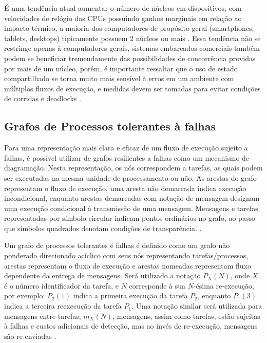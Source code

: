 É uma tendência atual aumentar o número de núcleos em dispositivos, com velocidades de relógio das CPUs possuindo ganhos marginais em relação ao impacto térmico, a maioria dos computadores de propósito geral (smartphones, tablets, desktops) tipicamente possuem 2 núcleos ou mais \cite{ComputerOrganizationAndDesign}. Essa tendência não se restringe apenas à computadores gerais, sistemas embarcados comerciais também podem se beneficiar tremendamente das possibilidades de concorrência providas por mais de um núcleo, porém, é importante ressaltar que o uso de estado compartilhado se torna muito mais sensível à erros em um ambiente com múltiplos fluxos de execução, e medidas devem ser tomadas para evitar condições de corridas e deadlocks \cite{OperatingSystemConcepts}.

\subsection{Grafos de Processos tolerantes à falhas}

Para uma representação mais clara e eficaz de um fluxo de execução sujeito a falhas, é possível utilizar de grafos resilientes a falhas como um mecanismo de diagramação. Nesta representação, os nós correspondem a tarefas, as quais podem ser executadas na mesma unidade de processamento ou não. As arestas do grafo representam o fluxo de execução, uma aresta não demarcada indica execução incondicional, enquanto arestas demarcadas com notação de mensagem designam uma execução condicional à transmissão de uma mensagem. Mensagens e tarefas representadas por símbolo circular indicam pontos ordinários no grafo, ao passo que símbolos quadrados denotam condições de transparência. \cite{SchedAndOptOfDistributedFT}.

Um grafo de processos tolerantes é falhas é definido como um grafo não ponderado direcionado acíclico com seus nós representando tarefas/processos, arestas representam o fluxo de execução e arestas nomeadas representam fluxo dependente da entrega de mensagens. Será utilizado a notação $P_X (N)$, onde $X$ é o número identificador da tarefa, e $N$ corresponde à sua $N$-ésima re-execução, por exemplo: $P_2 (1)$ indica a primeira execução da tarefa $P_2$, enquanto $P_1 (3)$ indica a terceira reexecução da tarefa $P_1$. Uma notação similar será utilizada para mensagens entre tarefas, $m_X (N)$, mensagens, assim como tarefas, estão sujeitas à falhas e custos adicionais de detecção, mas ao invés de re-execução, mensagens são re-enviadas \cite{SchedFTWithSoftAndHardConstraints}.

